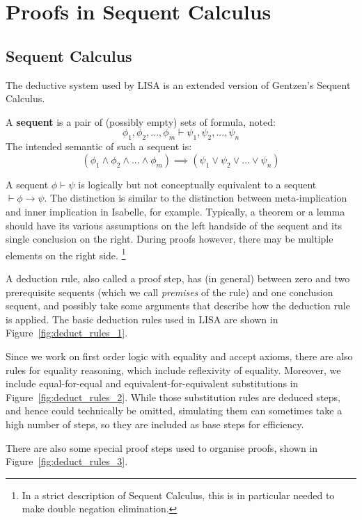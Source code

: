 \section{Proofs in Sequent Calculus}
\label{sect:proofs_lk}
\subsection{Sequent Calculus}
\label{subs:lk}
The deductive system used by LISA is an extended version of Gentzen's Sequent Calculus.
\begin{defin}
A \textbf{sequent} is a pair of (possibly empty) sets of formula, noted:
$$\phi_1, \phi_2, ..., \phi_m \vdash \psi_1, \psi_2, ..., \psi_n$$
The intended semantic of such a sequent is:
\begin{equation}
\label{eq:SequentSemantic}
(\phi_1 \land \phi_2 \land ... \land \phi_m ) \implies (\psi_1 \lor \psi_2 \lor ... \lor \psi_n )
\end{equation}

\end{defin}
A sequent $\phi \vdash \psi$ is logically but not conceptually equivalent to a sequent $\vdash \phi \rightarrow \psi$. The distinction is similar to the distinction between meta-implication and inner implication in Isabelle, for example. Typically, a theorem or a lemma should have its various assumptions on the left handside of the sequent and its single conclusion on the right. During proofs however, there may be multiple elements on the right side. \footnote{In a strict description of Sequent Calculus, this is in particular needed to make double negation elimination.}

A deduction rule, also called a proof step, has  (in general) between zero and two prerequisite sequents (which we call \textit{premises} of the rule) and one conclusion sequent, and possibly take some arguments that describe how the deduction rule is applied. The basic deduction rules used in LISA are shown in Figure~\ref{fig:deduct_rules_1}.


Since we work on first order logic with equality and accept axioms, there are also rules for equality reasoning, which include reflexivity of equality. Moreover, we include equal-for-equal and equivalent-for-equivalent substitutions in Figure~\ref{fig:deduct_rules_2}. While those substitution rules are deduced steps, and hence could technically be omitted, simulating them can sometimes take a high number of steps, so they are included as base steps for efficiency. 

There are also some special proof steps used to organise proofs, shown in Figure~\ref{fig:deduct_rules_3}.

